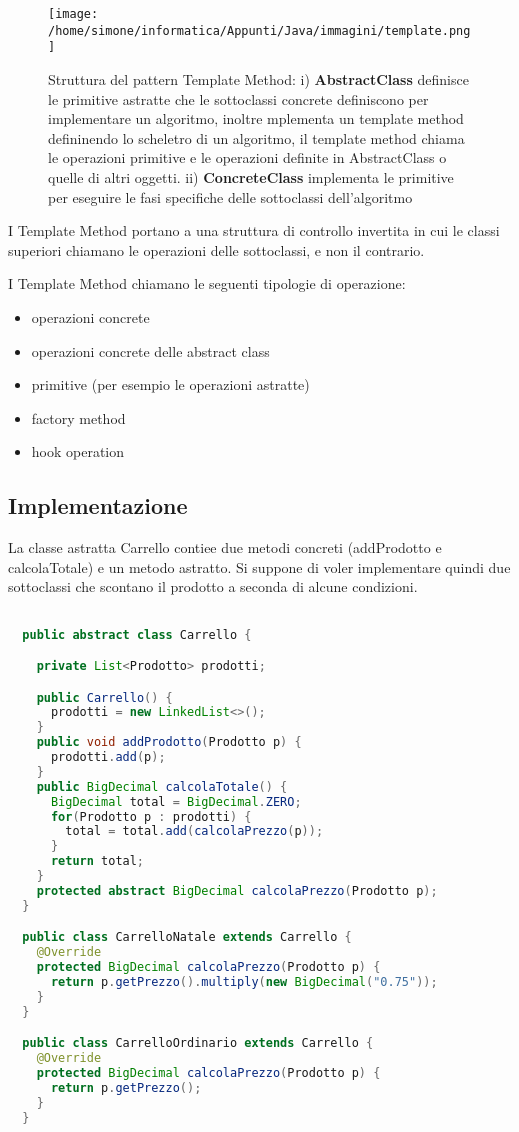 \documentclass[a4paper,12pt,twoside]{book}
\begin{document}
\begin{figure}
  \centering
  \texttt{[image: /home/simone/informatica/Appunti/Java/immagini/template.png]}
  \caption{Struttura del pattern Template Method: i)
    \textbf{AbstractClass} definisce le primitive astratte che le
    sottoclassi concrete definiscono per implementare un
    algoritmo, inoltre mplementa un template method defininendo lo
    scheletro di un algoritmo, il template method chiama le operazioni
    primitive e le operazioni definite in AbstractClass o quelle di
    altri oggetti. ii) \textbf{ConcreteClass} implementa le primitive
    per eseguire le fasi specifiche delle sottoclassi dell'algoritmo}
\end{figure}

I Template Method portano a una struttura di controllo invertita in
cui le classi superiori chiamano le operazioni delle sottoclassi, e
non il contrario.

I Template Method chiamano le seguenti tipologie di operazione:
\begin{itemize}
\item operazioni concrete
\item operazioni concrete delle abstract class
\item primitive (per esempio le operazioni astratte)
\item factory method
\item hook operation
\end{itemize}

\subsection{Implementazione}

La classe astratta Carrello contiee due metodi concreti (addProdotto e
calcolaTotale) e un metodo astratto. Si suppone di voler implementare
quindi due sottoclassi che scontano il prodotto a seconda di alcune
condizioni.

\begin{lstlisting}[caption={},
  label={lst:TempMeth},language=Java]

  public abstract class Carrello {

    private List<Prodotto> prodotti;

    public Carrello() {
      prodotti = new LinkedList<>();
    }
    public void addProdotto(Prodotto p) {
      prodotti.add(p);
    }
    public BigDecimal calcolaTotale() {
      BigDecimal total = BigDecimal.ZERO;
      for(Prodotto p : prodotti) {
        total = total.add(calcolaPrezzo(p));
      }
      return total;
    }
    protected abstract BigDecimal calcolaPrezzo(Prodotto p);
  }

  public class CarrelloNatale extends Carrello {
    @Override
    protected BigDecimal calcolaPrezzo(Prodotto p) {
      return p.getPrezzo().multiply(new BigDecimal("0.75"));
    }
  }

  public class CarrelloOrdinario extends Carrello {
    @Override
    protected BigDecimal calcolaPrezzo(Prodotto p) {
      return p.getPrezzo();
    }
  }

\end{lstlisting}
\end{document}
